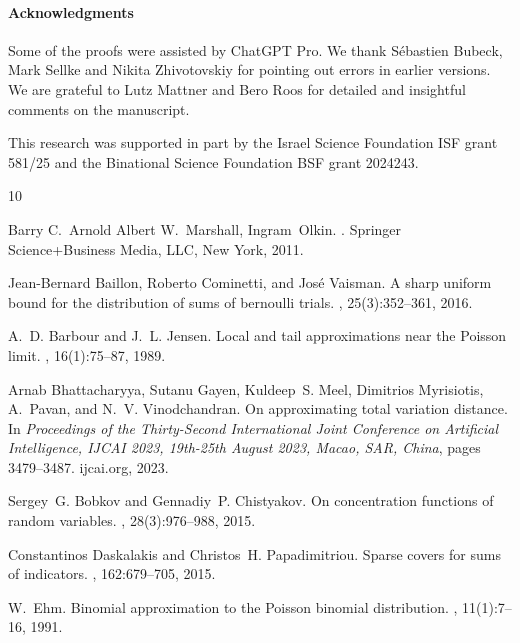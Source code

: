 \documentclass[11pt]{amsart}
\theoremstyle{plain}
\theoremstyle{definition}
\begin{document}
\paragraph{Acknowledgments}
Some of the proofs were assisted by ChatGPT Pro.
We thank Sébastien Bubeck, Mark Sellke and Nikita Zhivotovskiy
for pointing out errors in earlier versions.
We are grateful to Lutz Mattner and Bero Roos
for detailed and insightful comments on the manuscript.

This research was supported in part by 
the Israel Science Foundation ISF grant
581/25
and the Binational Science Foundation BSF grant
2024243.


\begin{thebibliography}{10}

Barry C.~Arnold Albert W.~Marshall, Ingram~Olkin.
.
\newblock Springer Science+Business Media, LLC, New York, 2011.

Jean-Bernard Baillon, Roberto Cominetti, and José Vaisman.
\newblock A sharp uniform bound for the distribution of sums of bernoulli
  trials.
, 25(3):352–361,
  2016.

A.~D. Barbour and J.~L. Jensen.
\newblock Local and tail approximations near the {Poisson} limit.
, 16(1):75--87, 1989.

Arnab Bhattacharyya, Sutanu Gayen, Kuldeep~S. Meel, Dimitrios Myrisiotis,
  A.~Pavan, and N.~V. Vinodchandran.
\newblock On approximating total variation distance.
\newblock In {\em Proceedings of the Thirty-Second International Joint
  Conference on Artificial Intelligence, {IJCAI} 2023, 19th-25th August 2023,
  Macao, SAR, China}, pages 3479--3487. ijcai.org, 2023.

Sergey~G. Bobkov and Gennadiy~P. Chistyakov.
\newblock On concentration functions of random variables.
, 28(3):976--988, 2015.

Constantinos Daskalakis and Christos~H. Papadimitriou.
\newblock Sparse covers for sums of indicators.
, 162:679--705, 2015.

W.~Ehm.
\newblock Binomial approximation to the {P}oisson binomial distribution.
, 11(1):7--16, 1991.


\end{thebibliography}
\end{document}
